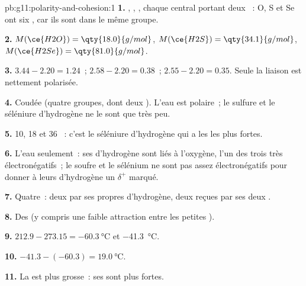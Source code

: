 \begin{solution}{pb:g11:polarity-and-cohesion:1}
\textbf{1.} , , , chaque  central
portant deux ~: O, S et Se ont six , car ils sont dans le même groupe.

\textbf{2.} $M(\ce{H2O}) = \qty{18.0}{g/mol}$, $M(\ce{H2S}) =
\qty{34.1}{g/mol}$, $M(\ce{H2Se}) = \qty{81.0}{g/mol}$.

\textbf{3.} $3.44 - 2.20 = 1.24$~; $2.58 - 2.20 = 0.38$~;
$2.55 - 2.20 = 0.35$. Seule la liaison  est nettement
polarisée.

\textbf{4.} Coudée (quatre groupes, dont deux ). L'eau
est polaire~; le sulfure et le séléniure d'hydrogène ne le sont que très
peu.

\textbf{5.} 10, 18 et 36 ~: c'est le séléniure d'hydrogène qui
a les  les plus fortes.

\textbf{6.} L'eau seulement~: ses  d'hydrogène sont liés à
l'oxygène, l'un des trois  très électronégatifs~; le soufre et le
sélénium ne sont pas assez électronégatifs pour donner à leurs 
d'hydrogène un $\delta^+$ marqué.

\textbf{7.} Quatre~: deux par ses propres  d'hydrogène, deux
reçues par ses deux .

\textbf{8.} Des  (y compris une faible
attraction entre les petites ).

\textbf{9.} $212.9 - 273.15 = \qty{-60.3}{\celsius}$ et
\qty{-41.3}{\celsius}.

\textbf{10.} $-41.3 - (-60.3) = \qty{19.0}{\celsius}$.

\textbf{11.} La  est plus grosse~: ses  sont plus fortes.


\end{solution}
